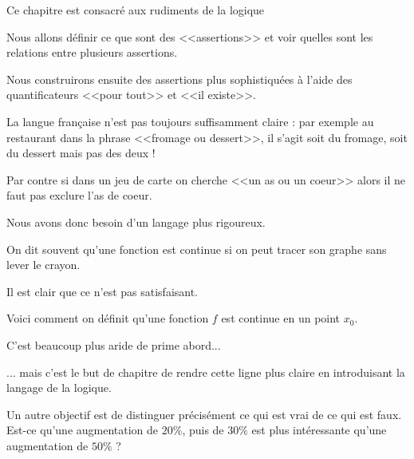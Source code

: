 


\renewcommand{\implies}{\; \Rightarrow\; } %






\debuttexte

\diapo

\change

Ce chapitre est consacré aux rudiments de la logique

\change

Nous allons définir ce que sont des <<assertions>>
et voir quelles sont les relations entre plusieurs assertions.

\change

Nous construirons ensuite des assertions plus sophistiquées à l'aide
des quantificateurs <<pour tout>> et <<il existe>>.


\diapo

La langue française n'est pas toujours suffisamment claire :
par exemple au restaurant dans la phrase <<fromage ou dessert>>,
il s'agit soit du fromage, soit du dessert mais pas des deux !

Par contre si dans un jeu de carte on cherche <<un as ou un coeur>>
alors il ne faut pas exclure l'as de coeur.

\change

Nous avons donc besoin d'un langage plus rigoureux.

\change

On dit souvent  qu'une fonction est continue si on peut tracer
son graphe sans lever le crayon.

Il est clair que ce n'est pas satisfaisant.

\change

Voici comment on définit qu'une fonction $f$ est continue en un point
$x_0$.

C'est beaucoup plus aride de prime abord...

\change 

... mais c'est le but de chapitre 
de rendre cette ligne plus claire
en introduisant la langage de la logique.


\change

Un autre objectif est de distinguer précisément ce qui est vrai de ce qui est faux.
\og Est-ce qu'une augmentation
de $20\%$, puis de $30\%$ est plus intéressante qu'une augmentation de $50\%$ ?\fg 

